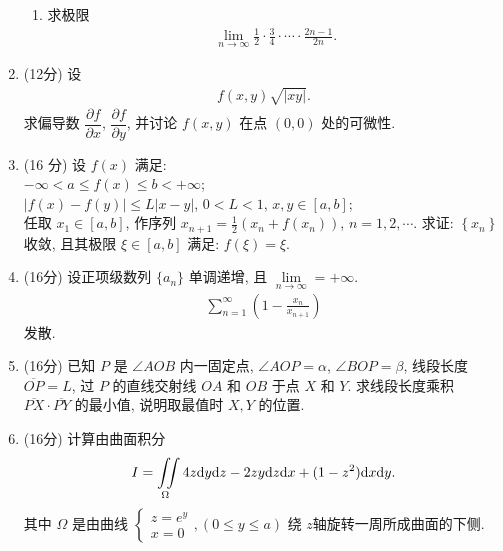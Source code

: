 \documentclass[space]{ctexart} %
\newcommand*\circled[1]{\raisebox{.5pt}{\textcircled{\raisebox{-.4pt} {\fontsize{12pt}{16pt}\selectfont#1}}}}
\def\leq{\leqslant}
\begin{document}
\begin{enumerate}[itemsep=1.5em,label=\arabic*.,topsep=0pt,left=0em]
\begin{enumerate}[itemsep=1em,label=(\arabic*),topsep=0pt,left=2em]
\item 求极限
\begin{align*}
  \lim\limits_{n\rightarrow \infty}\frac{1}{2}\cdot\frac{3}{4}\cdot\cdots\cdot\frac{2n-1}{2n}.
\end{align*}

\end{enumerate}



\item (12分) 设
\begin{align*}
  f(x,y)\sqrt{|xy|}.
\end{align*}
求偏导数 $\dfrac{\partial f}{\partial x}$, $\dfrac{\partial f}{\partial y}$, 并讨论 $f(x,y)$ 在点 $(0,0)$ 处的可微性.


\item (16 分) 设 $f(x)$ 满足:\\
 \circled{1} $-\infty<a\leq f(x) \leq b<+\infty$;\\
 \circled{2} $|f(x)-f(y)| \leq L|x-y|$, $0<L<1$, $x, y \in[a, b]$;\\
任取  $x_{1} \in[a, b]$, 作序列 $x_{n+1}=\frac{1}{2}\left(x_{n}+f\left(x_{n}\right)\right)$, $n=1,2, \cdots$. 求证: $\left\{x_{n}\right\}$  收敛, 且其极限  $\xi \in[a, b]$  满足:
$f(\xi)=\xi$.


\item (16分) 设正项级数列 $\{a_{n}\}$ 单调递增, 且 $\lim\limits_{n\rightarrow \infty}=+\infty$.
\begin{align*}
    \sum_{n=1}^{\infty} \left(1-\frac{x_{n}}{x_{n+1}}\right)
\end{align*}
发散.

\item (16分) 已知  $P$  是  $\angle A O B $ 内一固定点,  $\angle A O P=\alpha$, $\angle B O P=\beta $, 线段长度 $ \overline{OP}=L $, 过  $P$  的直线交射线  $O A$  和 $ O B $ 于点 $ X$  和 $ Y $. 求线段长度乘积 $ \overline{P X} \cdot \overline{P Y}$  的最小值, 说明取最值时  $X, Y $ 的位置.

\item (16分) 计算由曲面积分
\begin{align*}
    I=\iint\limits_{\Omega}4z{\rm d}y{\rm d}z-2zy{\rm d}z{\rm d}x+
    (1-z^2){\rm d}x{\rm d}y.
\end{align*}
 其中  $\Omega$ 是由曲线 $\begin{cases}
     z=e^{y} \\
    x=0
 \end{cases},(0 \leq y \leq a)$ 绕 $z $轴旋转一周所成曲面的下侧.


\end{enumerate}
\end{document}
